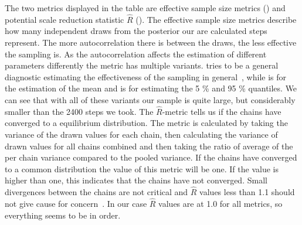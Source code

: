 \documentclass[12pt,a4paper,leqno]{report}
\theoremstyle{plain}
\theoremstyle{definition}
\theoremstyle{remark}
\begin{document}

The two metrics displayed in the table are effective sample size metrics ()
and potential scale reduction statistic \(\hat{R}\) (). The effective sample
size metrics describe how many independent draws from the posterior our are calculated steps
represent. The more autocorrelation there is between the draws, the less effective the
sampling is. As the autocorrelation affects the estimation of different parameters
differently the metric has multiple variants.  tries to be a general
diagnostic estimating the effectiveness of the sampling in general\
\cite{essbulk}, while  is for the estimation of the mean and
\pyv{ess_tail} is for estimating the 5 \% and 95 \% quantiles. We can see that with all
of these variants our sample is quite large, but considerably smaller than the 2400
steps we took. The \(\hat{R}\)-metric
tells us if the chains have converged to a equilibrium distribution. The metric is calculated by
taking the variance of the drawn values for each chain,
then calculating the variance of drawn values for all chains combined and then taking the
ratio of average of the per chain variance compared to the pooled variance. If the
chains have converged to a common distribution the value of this metric will be one. If
the value is higher than one, this indicates that the chains have not converged. Small
divergences between the chains are not critical and \(\hat{R}\) values less than 1.1 should
not give cause for concern\ \cite{rhatrule}. In our case \(\hat{R}\) values are at 1.0 for
all metrics, so everything seems to be in order.
\end{document}
